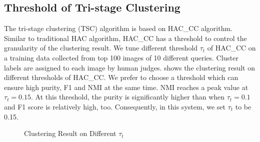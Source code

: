 
\subsection{Threshold of Tri-stage Clustering}
The tri-stage clustering (TSC) algorithm is based on HAC\_CC
algorithm. Similar to traditional HAC algorithm, HAC\_CC has
a threshold to control the granularity of the clustering
result. We tune different threshold $\tau_t$ of HAC\_CC on a training
data collected from top 100 images of 10 different queries.
Cluster labels are assigned to each image by human judges.
 shows the clustering result on
different thresholds of HAC\_CC.
We prefer to choose a threshold which can ensure high purity, F1 and NMI
at the same time. NMI reaches a peak value at $\tau_t=0.15$. 
At this threshold, the purity is significantly higher than when
$\tau_t=0.1$ and F1 score is relatively high, too.
Consequently, in this system, we set $\tau_t$ to be 0.15.

\begin{figure}[th]
\centerline{}
	\caption{Clustering Result on Different $\tau_t$}
	\label{fig:thtri}
\end{figure}



